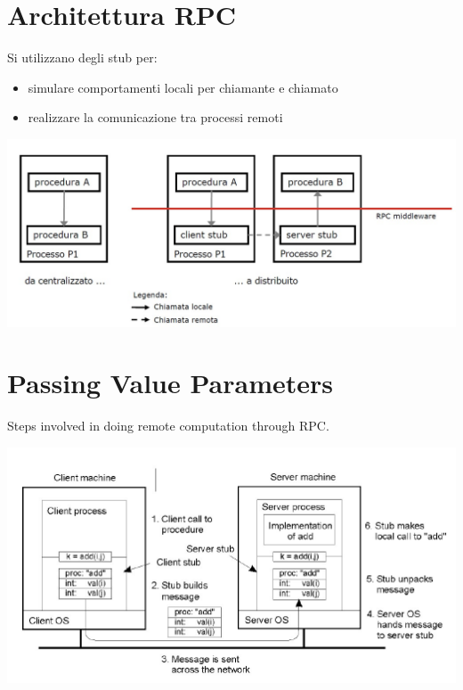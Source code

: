 \section{Architettura RPC}
Si utilizzano degli stub per:
\begin{itemize}
    \item simulare comportamenti locali per chiamante e chiamato
    \item realizzare la comunicazione tra processi remoti
\end{itemize}
\begin{center}
    \includegraphics[scale=0.5]{img/RPC_architettura1.jpg}
\end{center}

\section{Passing Value Parameters}
Steps involved in doing remote computation through RPC.
\begin{center}
    \includegraphics[scale=0.5]{img/RPC_passaggioparametri1.jpg}
\end{center}

